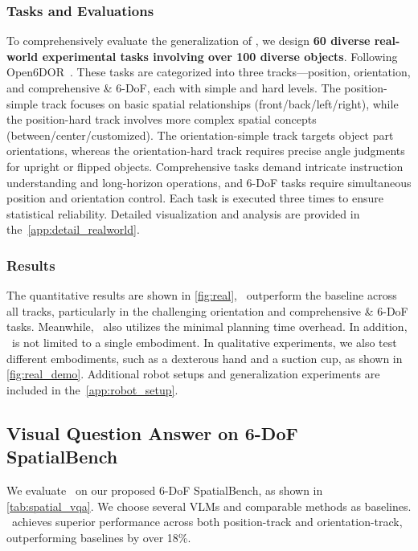 \subsubsection{Tasks and Evaluations}
To comprehensively evaluate the generalization of \sofar, we design \textbf{60 diverse real-world experimental tasks involving over 100 diverse objects}. Following Open6DOR~\cite{Open6DOR24}. These tasks are categorized into three tracks—position, orientation, and comprehensive \& 6-DoF, each with simple and hard levels. The position-simple track focuses on basic spatial relationships (front/back/left/right), while the position-hard track involves more complex spatial concepts (between/center/customized). The orientation-simple track targets object part orientations, whereas the orientation-hard track requires precise angle judgments for upright or flipped objects. Comprehensive tasks demand intricate instruction understanding and long-horizon operations, and 6-DoF tasks require simultaneous position and orientation control. Each task is executed three times to ensure statistical reliability. Detailed visualization and analysis are provided in the~\cref{app:detail_realworld}.

\subsubsection{Results}
The quantitative results are shown in \cref{fig:real}, \sofar~outperform the baseline across all tracks, particularly in the challenging orientation and comprehensive \& 6-DoF tasks. Meanwhile, \sofar~also utilizes the minimal planning time overhead.
In addition, \sofar~is not limited to a single embodiment. In qualitative experiments, we also test different embodiments, such as a dexterous hand and a suction cup, as shown in \cref{fig:real_demo}. Additional robot setups and generalization experiments are included in the~\cref{app:robot_setup}.


\subsection{Visual Question Answer on 6-DoF SpatialBench}
We evaluate \ours~on our proposed 6-DoF SpatialBench, as shown in \cref{tab:spatial_vqa}. We choose several VLMs and comparable methods as baselines.
\ours~achieves superior performance across both position-track and orientation-track, outperforming baselines by over 18\%.


